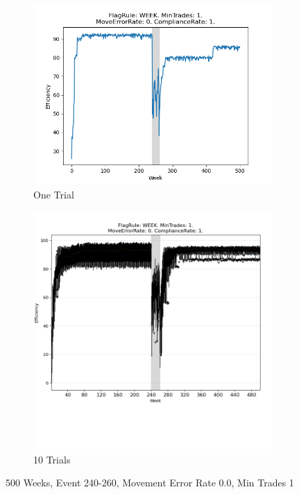 \documentclass{article}%
\begin{document}
%


\begin{figure}[!htb]%
\begin{subfigure}[b]{0.45\linewidth}%
\includegraphics[width=\linewidth]{2028fr_WEEK_mt_1_er_0_cr_1_t1.png}%
\caption{One Trial}%
\end{subfigure}%
\begin{subfigure}[b]{0.45\linewidth}%
\includegraphics[clip,width=\linewidth,trim=0 4cm 0 0]{2028fr_WEEK_mt_1_er_0_cr_1_t10.png}%
\caption{10 Trials}%
\end{subfigure}%
\caption{500 Weeks, Event 240{-}260, Movement Error Rate 0.0, Min Trades 1}%
\end{figure}
\end{document}
